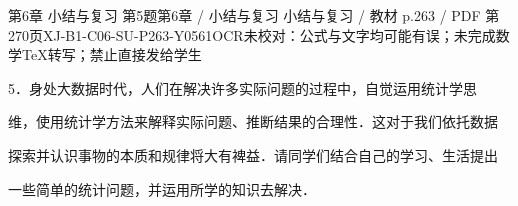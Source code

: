 \begin{bankitem}{第6章 小结与复习 第5题}{第6章 / 小结与复习 小结与复习 / 教材 p.263 / PDF 第270页}{XJ-B1-C06-SU-P263-Y0561}{OCR未校对：公式与文字均可能有误；未完成数学TeX转写；禁止直接发给学生}
\begin{ocrdraft}
\par
5．身处大数据时代，人们在解决许多实际问题的过程中，自觉运用统计学思
\par
维，使用统计学方法来解释实际问题、推断结果的合理性．这对于我们依托数据
\par
探索并认识事物的本质和规律将大有裨益．请同学们结合自己的学习、生活提出
\par
一些简单的统计问题，并运用所学的知识去解决．
\end{ocrdraft}
\end{bankitem}
